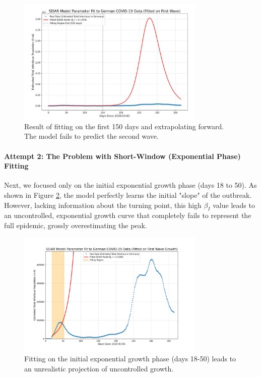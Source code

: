 \documentclass[12pt, a4paper]{article}
\begin{document}
\begin{figure}[h!]
    \centering
    \includegraphics[width=0.8\textwidth]{1/linear_-1.png}
    \caption{Result of fitting on the first 150 days and extrapolating forward. The model fails to predict the second wave.}
    \label{fig:linear_neg1}
\end{figure}

\paragraph{Attempt 2: The Problem with Short-Window (Exponential Phase) Fitting}
Next, we focused only on the initial exponential growth phase (days 18 to 50). As shown in Figure \ref{fig:linear_0}, the model perfectly learns the initial "slope" of the outbreak. However, lacking information about the turning point, this high $\beta_I$ value leads to an uncontrolled, exponential growth curve that completely fails to represent the full epidemic, grossly overestimating the peak.

\begin{figure}[h!]
    \centering
    \includegraphics[width=0.8\textwidth]{1/linear_0.png}
    \caption{Fitting on the initial exponential growth phase (days 18-50) leads to an unrealistic projection of uncontrolled growth.}
    \label{fig:linear_0}
\end{figure}
\end{document}
